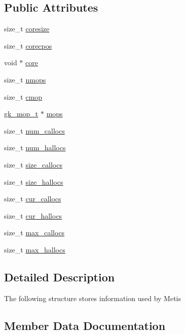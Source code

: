 \subsection*{Public Attributes}
\begin{DoxyCompactItemize}
\item 
size\+\_\+t \hyperlink{a00682_a834677bb8263a1b0475104889883c86c}{coresize}
\item 
size\+\_\+t \hyperlink{a00682_a5cc856b4f3049f9d49c9f3ec10b73739}{corecpos}
\item 
void $\ast$ \hyperlink{a00682_a2d0056e8cc124fad35b901e89668b8b1}{core}
\item 
size\+\_\+t \hyperlink{a00682_a30d17f8009db5d7cf61094259ff9e26f}{nmops}
\item 
size\+\_\+t \hyperlink{a00682_a3631e211c793af96e0abf21cb95de4ae}{cmop}
\item 
\hyperlink{a00678}{gk\+\_\+mop\+\_\+t} $\ast$ \hyperlink{a00682_a74e825c8a07e7c040dbf947bedac3339}{mops}
\item 
size\+\_\+t \hyperlink{a00682_afd16bb0581bc9e98172b2ab35cbc310c}{num\+\_\+callocs}
\item 
size\+\_\+t \hyperlink{a00682_a2ad475b19470a6a7b0c65e53cfd1096b}{num\+\_\+hallocs}
\item 
size\+\_\+t \hyperlink{a00682_aa407f9b9ca318fa8afa36ab1c936ec07}{size\+\_\+callocs}
\item 
size\+\_\+t \hyperlink{a00682_a4c180c60538546b4ab67bb91264e1c6e}{size\+\_\+hallocs}
\item 
size\+\_\+t \hyperlink{a00682_a488b0e7fbec1333c47a736af554a640c}{cur\+\_\+callocs}
\item 
size\+\_\+t \hyperlink{a00682_a69514abe8ce1822030428ca391a903e7}{cur\+\_\+hallocs}
\item 
size\+\_\+t \hyperlink{a00682_a536a8ab027c1f70bfe5b56a26059589b}{max\+\_\+callocs}
\item 
size\+\_\+t \hyperlink{a00682_a74723a880e8829c81bd3a38ed474f09a}{max\+\_\+hallocs}
\end{DoxyCompactItemize}


\subsection{Detailed Description}
The following structure stores information used by Metis 

\subsection{Member Data Documentation}
\mbox{\label{a00682_a3631e211c793af96e0abf21cb95de4ae}} 
